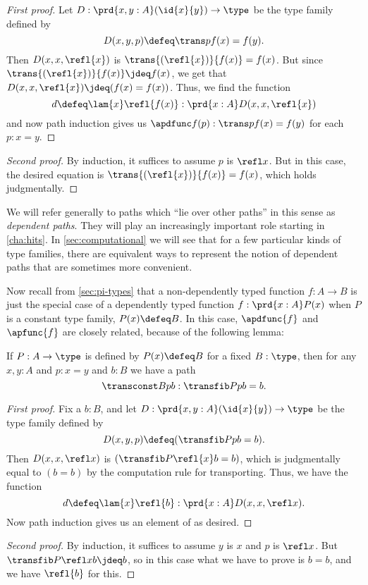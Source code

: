 \begin{proof}[First proof]
  Let $D:\prd{x,y:A} (\id{x}{y}) \to \type$ be the type family defined by
  \begin{equation*}
    D(x,y,p)\defeq \trans p {f(x)}= f(y).
  \end{equation*}
  Then $D(x,x,\refl{x})$ is $\trans{(\refl{x})}{f(x)}= f(x)$.
  But since $\trans{(\refl{x})}{f(x)}\jdeq f(x)$, we get that $D(x,x,\refl{x})\jdeq (f(x)= f(x))$.
  Thus, we find the function
  \begin{equation*}
    d\defeq\lam{x} \refl{f(x)}:\prd{x:A} D(x,x,\refl{x})
  \end{equation*}
  and now path induction gives us $\apdfunc f(p):\trans p{f(x)}= f(y)$ for each $p:x= y$.
\end{proof}

\begin{proof}[Second proof]
  By induction, it suffices to assume $p$ is $\refl x$.
  But in this case, the desired equation is $\trans{(\refl{x})}{f(x)}= f(x)$, which holds judgmentally.
\end{proof}

We will refer generally to paths which ``lie over other paths'' in this sense as \emph{dependent paths}.
%
%
They will play an increasingly important role starting in \cref{cha:hits}.
In \cref{sec:computational} we will see that for a few particular kinds of type families, there are equivalent ways to represent the notion of dependent paths that are sometimes more convenient.

Now recall from \cref{sec:pi-types} that a non-dependently typed function $f:A\to B$ is just the special case of a dependently typed function $f:\prd{x:A} P(x)$ when $P$ is a constant type family, $P(x) \defeq B$.
In this case, $\apdfunc{f}$ and $\apfunc{f}$ are closely related, because of the following lemma:

\begin{lem}\label{thm:trans-trivial}
  If $P:A\to\type$ is defined by $P(x) \defeq B$ for a fixed $B:\type$, then for any $x,y:A$ and $p:x=y$ and $b:B$ we have a path
  \[ \transconst Bpb : \transfib P p b = b. \]
\end{lem}
\begin{proof}[First proof]
  Fix a $b:B$, and let $D:\prd{x,y:A} (\id{x}{y}) \to \type$ be the type family defined by
  \[ D(x,y,p) \defeq (\transfib P p b = b). \]
  Then $D(x,x,\refl x)$ is $(\transfib P{\refl{x}}{b} = b)$, which is judgmentally equal to $(b=b)$ by the computation rule for transporting.
  Thus, we have the function
  \[ d \defeq \lam{x} \refl{b} : \prd{x:A} D(x,x,\refl x). \]
  Now path induction gives us an element of
  as desired.
\end{proof}
\begin{proof}[Second proof]
  By induction, it suffices to assume $y$ is $x$ and $p$ is $\refl x$.
  But $\transfib P {\refl x} b \jdeq b$, so in this case what we have to prove is $b=b$, and we have $\refl{b}$ for this.
\end{proof}

